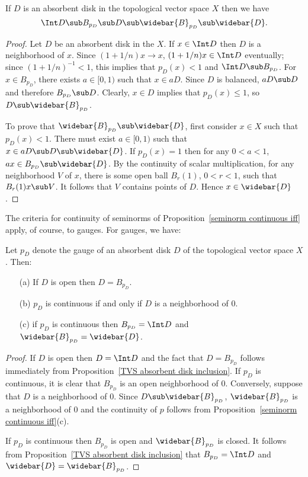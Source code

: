 \begin{proposition}\label{TVS absorbent disk inclusion}
If $D$ is an absorbent disk in the topological vector space $X$ then we have
\[\Int D\sub B_{p_D}\sub D\sub\widebar{B}_{p_D}\sub\widebar{D}.\]
\end{proposition}
\begin{proof}
Let $D$ be an absorbent disk in the $X$. If $x\in\Int D$ then $D$ is a neighborhood of $x$. Since $(1+1/n)x\to x$, $(1+1/n)x\in\Int D$ eventually; since $(1+1/n)^{-1}<1$, this implies that $p_D(x)<1$ and $\Int D\sub B_{p_D}$. For $x\in B_{p_D}$, there exists $a\in[0,1)$ such that $x\in aD$. Since $D$ is balanced, $aD\sub D$ and therefore $B_{p_D}\sub D$. Clearly, $x\in D$ implies that $p_D(x)\leq 1$, so $D\sub\widebar{B}_{p_D}$.\par
To prove that $\widebar{B}_{p_D}\sub\widebar{D}$, first consider $x\in X$ such that $p_D(x)<1$. There must exist $a\in[0,1)$ such that $x\in aD\sub D\sub\widebar{D}$. If $p_D(x)=1$ then for any $0<a<1$, $ax\in B_{p_D}\sub\widebar{D}$. By the continuity of scalar multiplication, for any neighborhood $V$ of $x$, there is some open ball $B_r(1)$, $0<r<1$, such that $B_r(1)x\sub V$. It follows that $V$ contains points of $D$. Hence $x\in\widebar{D}$.
\end{proof}
The criteria for continuity of seminorms of Proposition~\ref{seminorm continuous iff} apply, of course, to gauges. For gauges, we have:
\begin{proposition}\label{TVS absorbent disk guage prop}
Let $p_D$ denote the gauge of an absorbent disk $D$ of the topological vector space $X$. Then:
\begin{itemize}
\item[(a)] If $D$ is open then $D=B_{p_D}$.
\item[(b)] $p_D$ is continuous if and only if $D$ is a neighborhood of $0$.
\item[(c)] if $p_D$ is continuous then $B_{p_D}=\Int D$ and $\widebar{B}_{p_D}=\widebar{D}$.
\end{itemize}
\end{proposition}
\begin{proof}
If $D$ is open then $D=\Int D$ and the fact that $D=B_{p_D}$ follows immediately from Proposition~\ref{TVS absorbent disk inclusion}. If $p_D$ is continuous, it is clear that $B_{p_D}$ is an open neighborhood of $0$. Conversely, suppose that $D$ is a neighborhood of $0$. Since $D\sub\widebar{B}_{p_D}$, $\widebar{B}_{p_D}$ is a neighborhood of $0$ and the continuity of $p$ follows from Proposition~\ref{seminorm continuous iff}(c).\par
If $p_D$ is continuous then $B_{p_D}$ is open and $\widebar{B}_{p_D}$ is closed. It follows from Proposition~\ref{TVS absorbent disk inclusion} that $B_{p_D}=\Int D$ and $\widebar{D}=\widebar{B}_{p_D}$.
\end{proof}

